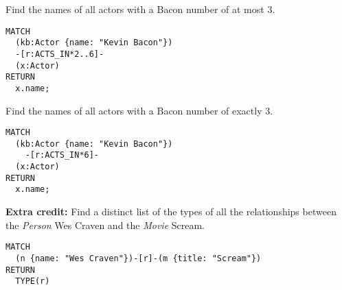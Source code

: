 \begin{questions}
\question
Find the names of all actors with a Bacon number of at most 3.
\begin{solution}
  \begin{verbatim}
MATCH
  (kb:Actor {name: "Kevin Bacon"})
  -[r:ACTS_IN*2..6]-
  (x:Actor)
RETURN
  x.name;
  \end{verbatim}
\end{solution}

\question
Find the names of all actors with a Bacon number of exactly 3.
\begin{solution}
  \begin{verbatim}
MATCH
  (kb:Actor {name: "Kevin Bacon"})
    -[r:ACTS_IN*6]-
  (x:Actor)
RETURN
  x.name;
  \end{verbatim}
\end{solution}

\question
\textbf{Extra credit:} Find a distinct list of the types of all the relationships between the \emph{Person} Wes Craven and the \emph{Movie} Scream.
\begin{solution}
  \begin{verbatim}
MATCH
  (n {name: "Wes Craven"})-[r]-(m {title: "Scream"})
RETURN
  TYPE(r)
  \end{verbatim}
\end{solution}



\end{questions}
